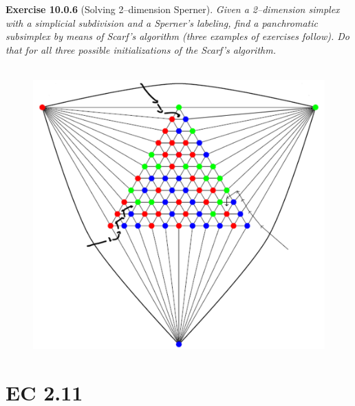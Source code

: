 \noindent
\textbf{Exercise 10.0.6} (Solving 2–dimension Sperner). \textit{Given a 2–dimension simplex with a simplicial subdivision and a Sperner’s labeling, find a panchromatic subsimplex by means of Scarf’s algorithm (three examples of exercises follow). Do that for all three possible initializations of the Scarf’s algorithm.}\\\\
\begin{figure}[H]
\centering
\includegraphics[width=\textwidth]{images/img_2_10_03.png}
\end{figure}
\noindent
\section{EC 2.11}

